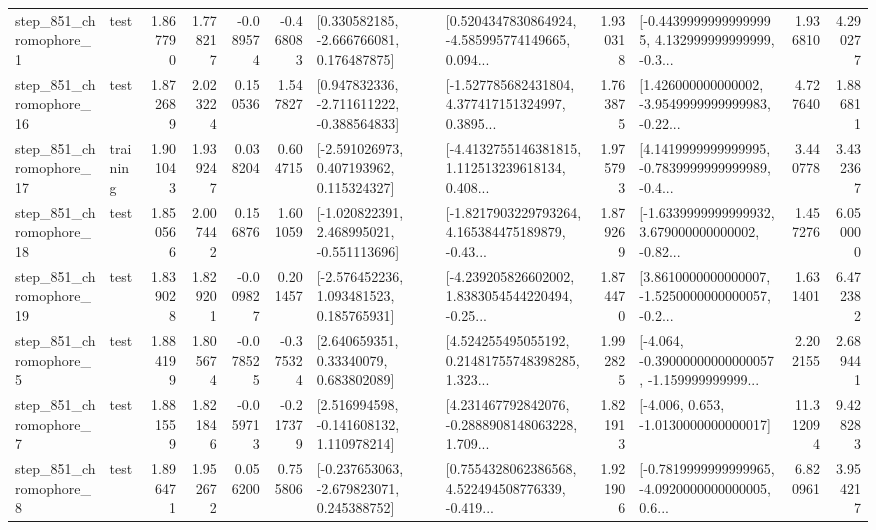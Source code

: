 \begin{tabular}{llrrrrllrlrr}
   step\_851\_chromophore\_1 &      test &      1.867790 &    1.778217 &     -0.089574 & -0.468083 &    [0.330582185, -2.666766081, 0.176487875] &  [0.5204347830864924, -4.585995774149665, 0.094... &       1.930318 &  [-0.44399999999999995, 4.132999999999999, -0.3... &            1.936810 &          4.290277 \\
  step\_851\_chromophore\_16 &      test &      1.872689 &    2.023224 &      0.150536 &  1.547827 &   [0.947832336, -2.711611222, -0.388564833] &  [-1.527785682431804, 4.377417151324997, 0.3895... &       1.763875 &  [1.426000000000002, -3.9549999999999983, -0.22... &            4.727640 &          1.886811 \\
  step\_851\_chromophore\_17 &  training &      1.901043 &    1.939247 &      0.038204 &  0.604715 &    [-2.591026973, 0.407193962, 0.115324327] &  [-4.4132755146381815, 1.112513239618134, 0.408... &       1.975793 &  [4.1419999999999995, -0.7839999999999989, -0.4... &            3.440778 &          3.432367 \\
  step\_851\_chromophore\_18 &      test &      1.850566 &    2.007442 &      0.156876 &  1.601059 &   [-1.020822391, 2.468995021, -0.551113696] &  [-1.8217903229793264, 4.165384475189879, -0.43... &       1.879269 &  [-1.6339999999999932, 3.679000000000002, -0.82... &            1.457276 &          6.050000 \\
  step\_851\_chromophore\_19 &      test &      1.839028 &    1.829201 &     -0.009827 &  0.201457 &    [-2.576452236, 1.093481523, 0.185765931] &  [-4.239205826602002, 1.8383054544220494, -0.25... &       1.874470 &  [3.8610000000000007, -1.5250000000000057, -0.2... &            1.631401 &          6.472382 \\
   step\_851\_chromophore\_5 &      test &      1.884199 &    1.805674 &     -0.078525 & -0.375324 &      [2.640659351, 0.33340079, 0.683802089] &  [4.524255495055192, 0.21481755748398285, 1.323... &       1.992825 &  [-4.064, -0.39000000000000057, -1.159999999999... &            2.202155 &          2.689441 \\
   step\_851\_chromophore\_7 &      test &      1.881559 &    1.821846 &     -0.059713 & -0.217379 &    [2.516994598, -0.141608132, 1.110978214] &  [4.231467792842076, -0.2888908148063228, 1.709... &       1.821913 &               [-4.006, 0.653, -1.0130000000000017] &           11.312094 &          9.428283 \\
   step\_851\_chromophore\_8 &      test &      1.896471 &    1.952672 &      0.056200 &  0.755806 &   [-0.237653063, -2.679823071, 0.245388752] &  [0.7554328062386568, 4.522494508776339, -0.419... &       1.921906 &  [-0.7819999999999965, -4.0920000000000005, 0.6... &            6.820961 &          3.954217 \\

\end{tabular}
